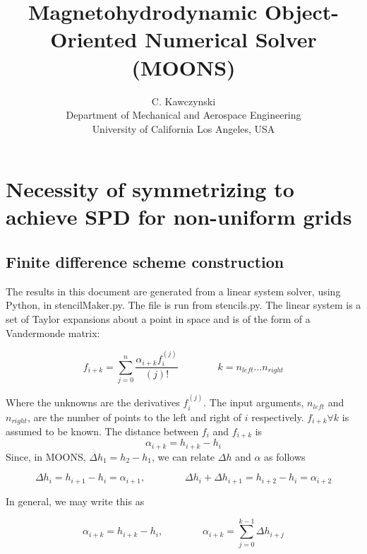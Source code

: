 \documentclass[landscape]{article}
\begin{document}
\doublespacing
\title{Magnetohydrodynamic Object-Oriented Numerical Solver (MOONS)}
\author{C. Kawczynski \\
Department of Mechanical and Aerospace Engineering \\
University of California Los Angeles, USA\\
}
\maketitle

\section{Necessity of symmetrizing to achieve SPD for non-uniform grids}

\subsection{Finite difference scheme construction}

The results in this document are generated from a linear system solver, using Python, in stencilMaker.py. The file is run from stencils.py. The linear system is a set of Taylor expansions about a point in space and is of the form of a Vandermonde matrix:

\begin{equation}
  f_{i+k}
  =
  \sum_{j=0}^n
  \frac{\alpha_{i+k} f_{i}^{(j)}}{(j)!}
  \qquad \qquad
  k = n_{left} \dots n_{right}
\end{equation}

Where the unknowns are the derivatives $f_i^{(j)}$. The input arguments, $n_{left}$ and $n_{right}$, are the number of points to the left and right of $i$ respectively. $f_{i+k}\forall k$ is assumed to be known. The distance between $f_{i}$ and $f_{i+k}$ is
\begin{equation}
  \alpha_{i+k}
  =
  h_{i+k} - h_{i}
\end{equation}
Since, in MOONS, $\Delta h_1 = h_2 - h_1$, we can relate $\Delta h$ and $\alpha$ as follows

\begin{equation}
  \Delta h_{i} = h_{i+1} - h_{i} = \alpha_{i+1}
  ,\qquad \qquad
  \Delta h_{i} + \Delta h_{i+1} = h_{i+2} - h_{i} = \alpha_{i+2}
\end{equation}

In general, we may write this as

\begin{equation}
  \alpha_{i+k} = h_{i+k} - h_{i}
  ,\qquad \qquad
  \alpha_{i+k} = \sum_{j=0}^{k-1} \Delta h_{i+j}
\end{equation}
\end{document}
